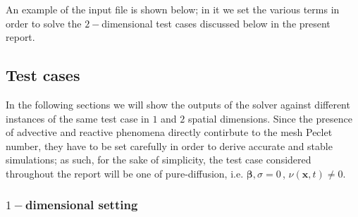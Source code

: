 \documentclass[12pt,openany,twoside,a4paper]{article}
\begin{document}
An example of the input file is shown below; in it we set the various terms in order to solve the $2-$dimensional test cases discussed below in the present report.
\newpage


\subsection{Test cases}

In the following sections we will show the outputs of the solver against different instances of the same test case in $1$ and $2$ spatial dimensions.
Since the presence of advective and reactive phenomena directly contirbute to the mesh Peclet number, they have to be set carefully in order to derive accurate and stable simulations; as such, for the sake of simplicity, the test case considered throughout the report will be one of pure-diffusion, i.e. $\boldsymbol{\beta},\sigma = 0\,$, $\nu(\mathbf{x},t)\neq0$.

\subsubsection{$1-$dimensional setting}

\newpage
\end{document}
